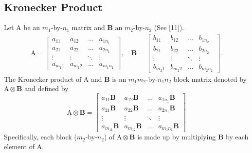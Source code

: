 \documentclass[11pt,a4paper]{article}
\begin{document}
\subsection{Kronecker Product}
	\qquad Let $\mathrm{A}$ be an $m_1$-by-$n_1$ matrix and $\mathbf{B}$ an $m_2$-by-$n_2$  (See [11]).
\begin{align*}
	\mathrm{A} = 
	\begin{bmatrix}
 		a_{11} & a_{12} & \ldots & a_{1n_1} \\
 		a_{21} & a_{22} & \ldots & a_{2n_1} \\
 		\vdots & \vdots & \ddots & \vdots \\
 		a_{m_1 1} & a_{m_1 2} & \ldots & a_{m_1 n_1} 
	\end{bmatrix},
	\quad
	\mathbf{B} = 
	\begin{bmatrix}
 		b_{11} & b_{12} & \ldots & b_{1n_2} \\
 		b_{21} & b_{22} & \ldots & b_{2n_2} \\
 		\vdots & \vdots & \ddots & \vdots \\
 		b_{m_2 1} & b_{m_2 2} & \ldots & b_{m_2 n_2} 
	\end{bmatrix}.
\end{align*}	
	The Kronecker product of $\mathrm{A}$ and $\mathbf{B}$ is an $m_1m_2$-by-$n_1n_2$ block matrix denoted by $\mathrm{A} \otimes \mathbf{B}$ and defined by
\begin{equation*}
\mathrm{A} \otimes \mathbf{B} =
\begin{bmatrix}
 a_{11}\mathbf{B} & a_{12}\mathbf{B} & \ldots & a_{1n_1}\mathbf{B} \\
 a_{21}\mathbf{B} & a_{22}\mathbf{B} & \ldots & a_{2n_1}\mathbf{B} \\
 \vdots & \vdots & \ddots & \vdots \\
 a_{m_11}\mathbf{B} & a_{m_12}\mathbf{B} & \ldots & a_{m_1n_1}\mathbf{B} 
\end{bmatrix}
\end{equation*}
Specifically, each block ($m_2$-by-$n_2$) of $\mathrm{A} \otimes \mathbf{B}$ is made up by multiplying $\mathbf{B}$ by each element of $\mathrm{A}$.\\
\end{document}
